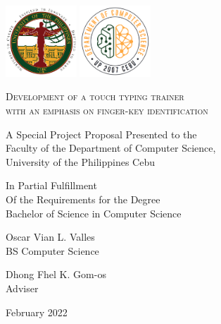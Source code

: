 \documentclass{report}
\begin{document}
\begin{titlepage}
	\centering

	\hspace{0pt}
	\vfill

	\includegraphics[width=0.2\textwidth]{upc.png}
	\includegraphics[width=0.2\textwidth]{dcs.png}
	\par\vspace{1cm}

	\textsc{Development of a touch typing trainer\\with an emphasis on finger-key identification }
	\par\vspace{0.5cm}

	\hrulefill{}
	\par\vspace{0.25cm}
	A Special Project Proposal Presented to the\\
	Faculty of the Department of Computer Science,\\
	University of the Philippines Cebu

	\par\vspace{0.25cm}
	In Partial Fulfillment\\
	Of the Requirements for the Degree\\
	Bachelor of Science in Computer Science\\
	\par\vspace{0.25cm}
	\hrulefill{}
	\par\vspace{0.5cm}

	Oscar Vian L. Valles\\
	BS Computer Science
	\par\vspace{0.5cm}

	Dhong Fhel K. Gom-os\\
	Adviser
	\par\vspace{0.5cm}

	February 2022
	\vfill
	\hspace{0pt}
\end{titlepage}
\end{document}
